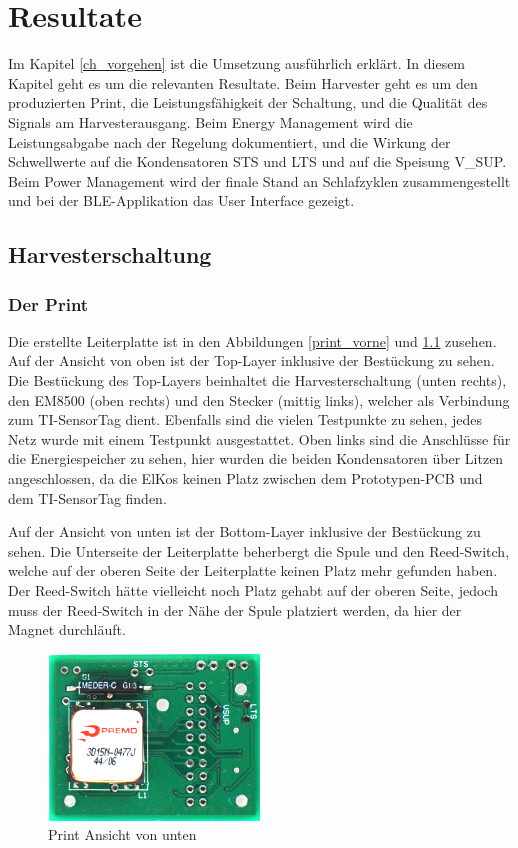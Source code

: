\chapter{Resultate}
\label{ch_resultat}

Im Kapitel \ref{ch_vorgehen} ist die Umsetzung ausführlich erklärt. In diesem Kapitel geht es um die relevanten Resultate. Beim Harvester geht es um den produzierten Print, die Leistungsfähigkeit der Schaltung, und die Qualität des Signals am Harvesterausgang. Beim Energy Management wird die Leistungsabgabe nach der Regelung dokumentiert, und die Wirkung der Schwellwerte auf die Kondensatoren STS und LTS und auf die Speisung V\_SUP. Beim Power Management wird der finale Stand an Schlafzyklen zusammengestellt und bei der BLE-Applikation das User Interface gezeigt.
 
\section{Harvesterschaltung}

\subsection{Der Print}

Die erstellte Leiterplatte ist in den Abbildungen \ref{print_vorne} und \ref{print_rueckseite} zusehen. Auf der Ansicht von oben ist der Top-Layer inklusive der Bestückung zu sehen. Die Bestückung des Top-Layers beinhaltet die Harvesterschaltung (unten rechts), den EM8500 (oben rechts) und den Stecker (mittig links), welcher als Verbindung zum TI-SensorTag dient. Ebenfalls sind die vielen Testpunkte zu sehen, jedes Netz wurde mit einem Testpunkt ausgestattet. Oben links sind die Anschlüsse für die Energiespeicher zu sehen, hier wurden die beiden Kondensatoren über Litzen angeschlossen, da die ElKos keinen Platz zwischen dem Prototypen-PCB und dem TI-SensorTag finden. 

Auf der Ansicht von unten ist der Bottom-Layer inklusive der Bestückung zu sehen. Die Unterseite der Leiterplatte beherbergt die Spule und den Reed-Switch, welche auf der oberen Seite der Leiterplatte keinen Platz mehr gefunden haben. Der Reed-Switch hätte vielleicht noch Platz gehabt auf der oberen Seite, jedoch muss der Reed-Switch in der Nähe der Spule platziert werden, da hier der Magnet durchläuft.

\begin{figure}[ht]
    \includegraphics[width=0.5\textwidth]{4Resultate/imag/print_rueckseite.png} 
    \caption{Print Ansicht von unten}
    \label{print_rueckseite}
\end{figure}


